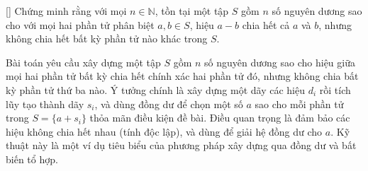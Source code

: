 \documentclass[../09-contruction-methods.tex]{subfiles}
\begin{document}
\begin{example*}\label{example:USA-2015-TST-P2}[\textbf{}]
	Chứng minh rằng với mọi \( n \in \mathbb{N} \), tồn tại một tập \( S \) gồm \( n \) số nguyên dương sao cho với mọi hai phần tử phân biệt \( a, b \in S \),
	hiệu \( a - b \) chia hết cả \( a \) và \( b \), nhưng không chia hết bất kỳ phần tử nào khác trong \( S \).
\end{example*}

\begin{story*}
    Bài toán yêu cầu xây dựng một tập \( S \) gồm \( n \) số nguyên dương sao cho hiệu giữa mọi hai phần tử bất kỳ chia hết chính xác hai phần tử đó,
	nhưng không chia bất kỳ phần tử thứ ba nào. Ý tưởng chính là xây dựng một dãy các hiệu \( d_i \) rồi tích lũy tạo thành dãy \( s_i \),
	và dùng đồng dư để chọn một số \( a \) sao cho mỗi phần tử trong \( S = \{ a + s_i \} \) thỏa mãn điều kiện đề bài.
	Điều quan trọng là đảm bảo các hiệu không chia hết nhau (tính độc lập), và dùng  để giải hệ đồng dư cho \( a \).
	Kỹ thuật này là một ví dụ tiêu biểu của phương pháp xây dựng qua đồng dư và bất biến tổ hợp.
\end{story*}

\bigbreak
\end{document}
